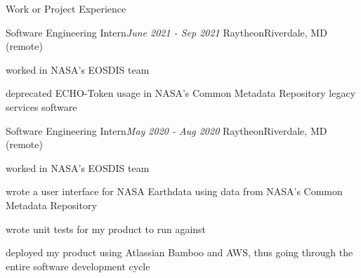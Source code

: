 \documentclass{resume} %
\begin{document}
\begin{rSection}{Work or Project Experience}



\begin{rSubsection}{Software Engineering Intern}{\em June 2021 - Sep 2021 }{Raytheon}{Riverdale, MD (remote)}
\item worked in NASA's EOSDIS team
\item deprecated ECHO-Token usage in NASA's Common Metadata Repository legacy services software
\end{rSubsection}

\begin{rSubsection}{Software Engineering Intern}{\em May 2020 - Aug 2020 }{Raytheon}{Riverdale, MD (remote)}
\item worked in NASA's EOSDIS team
\item wrote a user interface for NASA Earthdata using data from NASA's Common Metadata Repository
\item wrote unit tests for my product to run against
\item deployed my product using Atlassian Bamboo and AWS, thus going through the entire software development cycle
\end{rSubsection}


\end{rSection}
\end{document}
